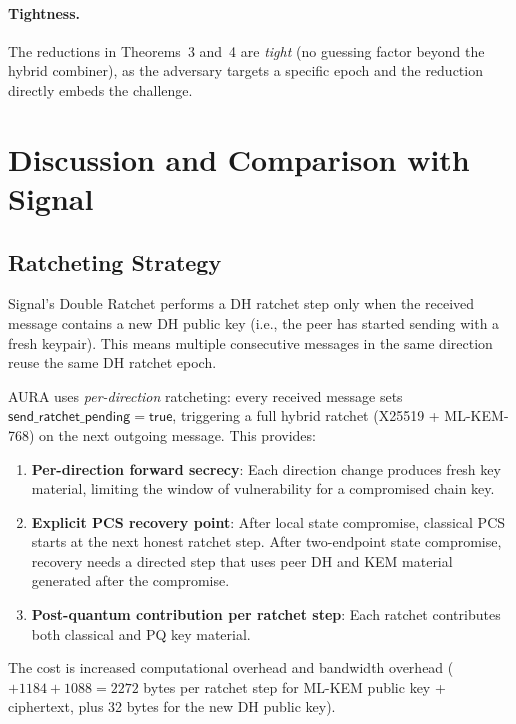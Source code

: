 \documentclass[11pt,a4paper]{article}
\theoremstyle{definition}
\theoremstyle{remark}
\begin{document}
\paragraph{Tightness.}
The reductions in Theorems~3 and~4 are \emph{tight} (no guessing
factor beyond the hybrid combiner), as the adversary targets a specific
epoch and the reduction directly embeds the challenge.


\section{Discussion and Comparison with Signal}
\label{sec:discussion}

\subsection{Ratcheting Strategy}

Signal's Double Ratchet performs a DH ratchet step only when the received
message contains a new DH public key (i.e., the peer has started sending
with a fresh keypair).  This means multiple consecutive messages in the
same direction reuse the same DH ratchet epoch.

AURA uses \emph{per-direction} ratcheting: every received message sets
$\mathsf{send\_ratchet\_pending} = \mathsf{true}$, triggering a full
hybrid ratchet (X25519 + ML-KEM-768) on the next outgoing message.  This
provides:

\begin{enumerate}[nosep]
  \item \textbf{Per-direction forward secrecy}: Each direction change produces
        fresh key material, limiting the window of vulnerability for a
        compromised chain key.
  \item \textbf{Explicit PCS recovery point}: After local state compromise,
        classical PCS starts at the next honest ratchet step. After
        two-endpoint state compromise, recovery needs a directed step that
        uses peer DH and KEM material generated after the compromise.
  \item \textbf{Post-quantum contribution per ratchet step}: Each ratchet
        contributes both classical and PQ key material.
\end{enumerate}

The cost is increased computational overhead and bandwidth overhead
($+1184 + 1088 = 2272$ bytes per ratchet step for ML-KEM public key +
ciphertext, plus 32 bytes for the new DH public key).
\end{document}
